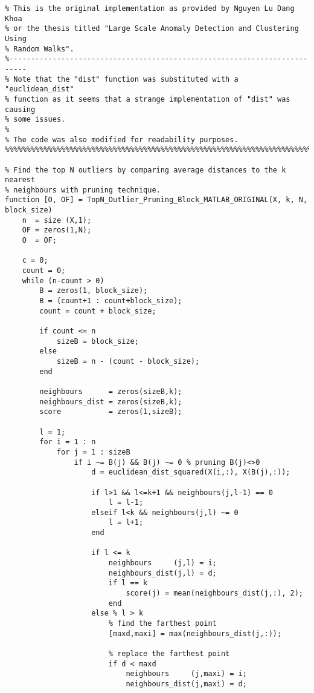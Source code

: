 \begin{lstlisting}
% This is the original implementation as provided by Nguyen Lu Dang Khoa
% or the thesis titled "Large Scale Anomaly Detection and Clustering Using
% Random Walks".
%--------------------------------------------------------------------------
% Note that the "dist" function was substituted with a "euclidean_dist"
% function as it seems that a strange implementation of "dist" was causing
% some issues.
%
% The code was also modified for readability purposes.
%%%%%%%%%%%%%%%%%%%%%%%%%%%%%%%%%%%%%%%%%%%%%%%%%%%%%%%%%%%%%%%%%%%%%%%%%%%

% Find the top N outliers by comparing average distances to the k nearest
% neighbours with pruning technique.
function [O, OF] = TopN_Outlier_Pruning_Block_MATLAB_ORIGINAL(X, k, N, block_size)
    n  = size (X,1);
    OF = zeros(1,N);
    O  = OF;

    c = 0;
    count = 0;
    while (n-count > 0)
        B = zeros(1, block_size);
        B = (count+1 : count+block_size);
        count = count + block_size;

        if count <= n
            sizeB = block_size;
        else
            sizeB = n - (count - block_size);
        end

        neighbours      = zeros(sizeB,k);
        neighbours_dist = zeros(sizeB,k);
        score           = zeros(1,sizeB);

        l = 1;
        for i = 1 : n
            for j = 1 : sizeB
                if i ~= B(j) && B(j) ~= 0 % pruning B(j)<>0
                    d = euclidean_dist_squared(X(i,:), X(B(j),:));

                    if l>1 && l<=k+1 && neighbours(j,l-1) == 0
                        l = l-1;
                    elseif l<k && neighbours(j,l) ~= 0
                        l = l+1;
                    end

                    if l <= k
                        neighbours     (j,l) = i;
                        neighbours_dist(j,l) = d;
                        if l == k
                            score(j) = mean(neighbours_dist(j,:), 2);
                        end
                    else % l > k
                        % find the farthest point
                        [maxd,maxi] = max(neighbours_dist(j,:));

                        % replace the farthest point
                        if d < maxd
                            neighbours     (j,maxi) = i;
                            neighbours_dist(j,maxi) = d;


\end{lstlisting}
